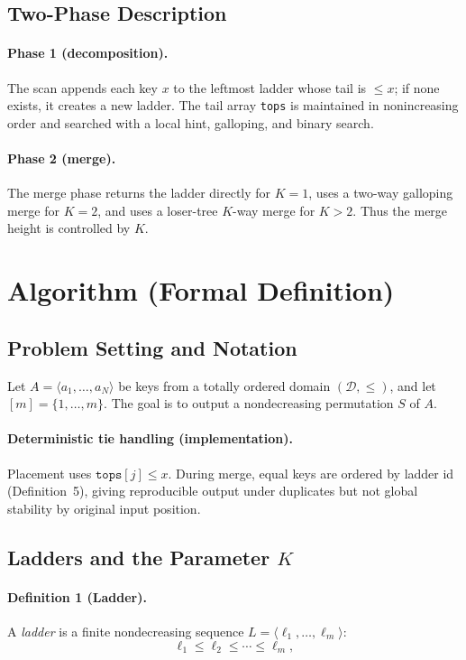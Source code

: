 \documentclass[10pt]{article}
\begin{document}
\subsection{Two-Phase Description}\label{two-phase}

\paragraph{Phase 1 (decomposition).}
The scan appends each key \(x\) to the leftmost ladder whose tail is \(\le x\); if none exists, it creates a new ladder. The tail array \texttt{tops} is maintained in nonincreasing order and searched with a local hint, galloping, and binary search.

\paragraph{Phase 2 (merge).}
The merge phase returns the ladder directly for \(K=1\), uses a two-way galloping merge for \(K=2\), and uses a loser-tree \(K\)-way merge for \(K>2\). Thus the merge height is controlled by \(K\).


\section{Algorithm (Formal Definition)}
\label{sec:algorithm}

\subsection{\textbf{Problem Setting and Notation}}
Let \(A=\langle a_1,\dots,a_N\rangle\) be keys from a totally ordered domain \((\mathcal{D},\le)\), and let \([m]=\{1,\dots,m\}\). The goal is to output a nondecreasing permutation \(S\) of \(A\).

\paragraph{Deterministic tie handling (implementation).}
Placement uses \(\texttt{tops}[j]\le x\). During merge, equal keys are ordered by ladder id (Definition~5), giving reproducible output under duplicates but not global stability by original input position.


\subsection{\textbf{Ladders and the Parameter $K$}}

\paragraph{Definition 1 (Ladder).}
A \emph{ladder} is a finite nondecreasing sequence \(L=\langle \ell_1,\dots,\ell_m\rangle\):
\[
\ell_1 \le \ell_2 \le \cdots \le \ell_m,
\]
\end{document}
